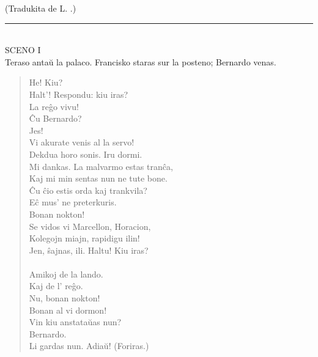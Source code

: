 \begin{center}
{\footnotesize (Tradukita de L. .)}\\[1ex]


\rule[0.5ex]{5mm}{0.4pt}\\[1ex]

{\large SCENO I}\\[1ex]

\footnotesize Teraso anta\u u la palaco. Francisko staras sur la posteno; Bernardo venas.
\end{center}

\begin{verse}
He! Kiu?\\
 Halt'! Respondu: kiu iras? \\
La reĝo vivu!\\
 \^Cu Bernardo?\\
 Jes!\\
 Vi akurate venis al la servo!\\
 Dekdua horo sonis. Iru dormi.\\
 Mi dankas. La malvarmo estas tran\^ca,\\ 
 Kaj mi min sentas nun ne tute bone.\\
 \^Cu \^cio estis orda kaj trankvila?\\
 E\^c mus' ne preterkuris.\\
 Bonan nokton!\\ Se vidos vi Marcellon, Horacion,\\ Kolegojn
miajn, rapidigu ilin!\\
 Jen, \^sajnas, ili. Haltu! Kiu iras?\\
\\
 Amikoj de la lando.\\
 Kaj de l' reĝo.\\
 Nu, bonan nokton!\\
 Bonan al vi dormon!\\ Vin kiu anstata\u uas nun?\\
 Bernardo.\\ Li gardas nun. Adia\u u! {\footnotesize (Foriras.)}\\

\end{verse}
